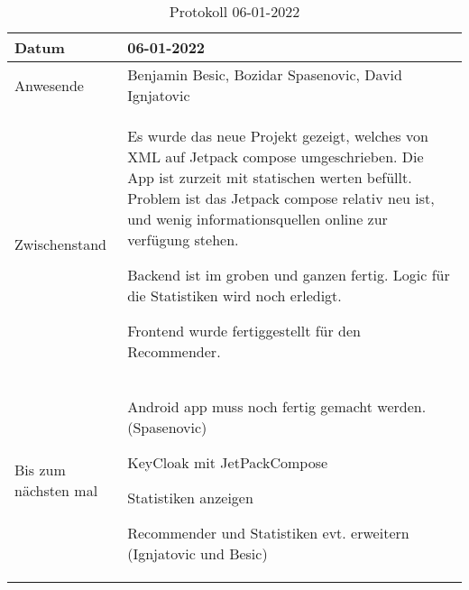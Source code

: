\begin{table}
    \begin{tabular}{ |p{3cm}|p{10cm}|   }
        \hline
        Datum & 06-01-2022\\
        \hline
        Anwesende & Benjamin Besic, Bozidar Spasenovic, David Ignjatovic\\

        \hline
        Zwischenstand& Es wurde das neue Projekt gezeigt, welches von XML auf Jetpack compose umgeschrieben.
        Die App ist zurzeit mit statischen werten befüllt.
        Problem ist das Jetpack compose relativ neu ist, und wenig informationsquellen online zur verfügung stehen.
        
        Backend ist im groben und ganzen fertig. Logic für die Statistiken wird noch erledigt.
        
        Frontend wurde fertiggestellt für den Recommender.\\
        \hline
        Bis zum nächsten mal &  





        Android app muss noch fertig gemacht werden. (Spasenovic)

        KeyCloak mit JetPackCompose
    
        Statistiken anzeigen
    
        Recommender und Statistiken evt. erweitern (Ignjatovic und Besic)
    
    


    
    \\
        \hline
    \end{tabular}
    \caption{Protokoll 06-01-2022}
    \label{tab:my_label}
\end{table}
